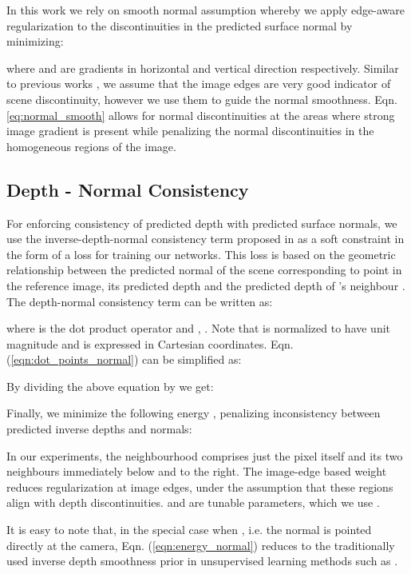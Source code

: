 \documentclass[letterpaper, 10 pt, conference]{ieeeconf}
\begin{document}
 In this work we rely on smooth normal assumption whereby we apply edge-aware regularization to the discontinuities in the predicted surface normal by minimizing:
 
where  and  are gradients in horizontal and vertical direction respectively. 
Similar to previous works \cite{godard2016depth,zhan2018depthVO}, we assume that the image edges are very good indicator of scene discontinuity, however we use them to guide the normal smoothness. Eqn. \eqref{eq:normal_smooth} allows for normal discontinuities at the areas where strong image gradient is present while penalizing the normal discontinuities in the homogeneous regions of the image.

 
 
\subsection{Depth - Normal Consistency} \label{sec:invDepth_normal}
For enforcing consistency of predicted depth with predicted surface normals, we use the inverse-depth-normal consistency term proposed in \cite{weerasekera2017normals} as a soft constraint in the form of a loss for training our networks. This loss is based on the geometric relationship between the predicted normal  of the scene corresponding to point  in the reference image, its predicted depth  and the predicted depth  of 's neighbour . The depth-normal consistency term can be written as:

where  is the dot product operator and , . Note that  is normalized to have unit magnitude and is expressed in Cartesian coordinates.
Eqn. (\ref{eqn:dot_points_normal}) can be simplified as:

By dividing the above equation by  we get:


Finally, we minimize the following energy , penalizing inconsistency between predicted inverse depths and normals:





In our experiments, the neighbourhood  comprises just the pixel itself and its two neighbours immediately below and to the right. The image-edge based weight  reduces regularization at image edges, under the assumption that these regions align with depth discontinuities.  and  are tunable parameters, which we use .

It is easy to note that, in the special case when ,
i.e. the normal  is pointed directly at the camera, Eqn. (\ref{eqn:energy_normal}) reduces to the traditionally used inverse depth smoothness prior in unsupervised learning methods such as \cite{garg2016depth}\cite{godard2016depth}\cite{zhan2018depthVO}.
\end{document}
